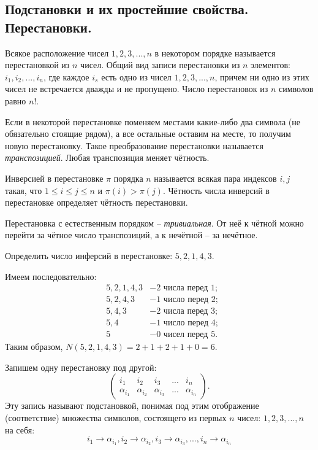 \documentclass[a4paper,14pt]{article}
\begin{document}
\subsection{Подстановки и их простейшие свойства. Перестановки.}
\begin{definition}
	Всякое расположение чисел $1, 2, 3,...,n$ в некотором порядке называется перестановкой из $n$ чисел. Общий вид записи перестановки из $n$ элементов: $i_1, i_2,...,i_n$, где каждое $i_s$ есть одно из чисел $1, 2, 3,...,n$, причем ни одно из этих чисел не встречается дважды и не пропущено. Число перестановок из $n$ символов равно $n!$.
\end{definition}
Если в некоторой перестановке поменяем местами какие-либо два символа (не обязательно стоящие рядом), а все остальные оставим на месте, то получим новую перестановку. Такое преобразование перестановки называется \textit{транспозицией}. Любая транспозиция меняет чётность.
\begin{definition}
	Инверсией в перестановке $\pi$ порядка $n$ называется всякая пара индексов $i, j$ такая, что $1 \le i \le j \le n$ и $\pi (i) > \pi (j)$. Чётность числа инверсий в перестановке определяет чётность перестановки.
\end{definition}
Перестановка с естественным порядком – \textit{тривиальная}. От неё к чётной можно перейти за чётное число транспозиций, а к нечётной – за нечётное.
\begin{exmp}
	Определить число инферсий в перестановке: $5, 2, 1, 4, 3$.
	
	\noindent Имеем последовательно:
	\begin{equation}
		\begin{aligned}
			& 5, 2, 1, 4, 3 & - 2 \text{ числа перед } 1; \\
			& 5, 2, 4, 3 & - 1 \text{ число перед } 2; \\
			& 5, 4, 3 & - 2 \text{ числа перед } 3; \\
			& 5, 4 & - 1 \text{ число перед } 4; \\
			& 5 & - 0 \text{ чисел перед } 5.
		\end{aligned}
	\end{equation}
	Таким образом, $N(5, 2, 1, 4, 3) = 2 + 1 + 2 + 1 + 0 = 6$.
\end{exmp}
\begin{definition}
	Запишем одну перестановку под другой:
	\begin{equation}\label{eq:perm}
	\begin{pmatrix}
	i_ 1 & i_2 & i_3 & ... & i_n \\
	\alpha_{i_1} & \alpha_{i_2} & \alpha_{i_3} & ... & \alpha_{i_n}
	\end{pmatrix}.
	\end{equation}
	Эту запись называют подстановкой, понимая под этим отображение (соответствие) множества символов, состоящего из первых $n$ чисел: $1, 2, 3,...,n$ на себя:
	\[i_1 \rightarrow \alpha_{i_1}, i_2 \rightarrow \alpha_{i_2}, i_3 \rightarrow \alpha_{i_3}, ..., i_n \rightarrow \alpha_{i_n}\]
\end{definition}
\end{document}
